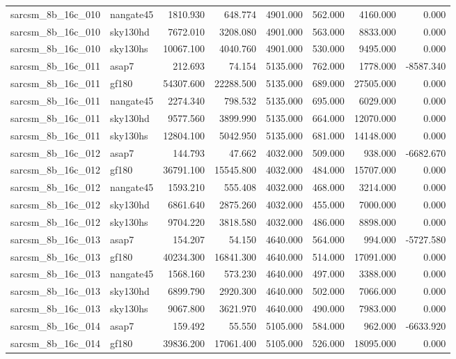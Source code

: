 \begin{tabular}{llrrrrrr}
sarcsm\_8b\_16c\_010 & nangate45 & 1810.930 & 648.774 & 4901.000 & 562.000 & 4160.000 & 0.000 \\
sarcsm\_8b\_16c\_010 & sky130hd & 7672.010 & 3208.080 & 4901.000 & 563.000 & 8833.000 & 0.000 \\
sarcsm\_8b\_16c\_010 & sky130hs & 10067.100 & 4040.760 & 4901.000 & 530.000 & 9495.000 & 0.000 \\
sarcsm\_8b\_16c\_011 & asap7 & 212.693 & 74.154 & 5135.000 & 762.000 & 1778.000 & -8587.340 \\
sarcsm\_8b\_16c\_011 & gf180 & 54307.600 & 22288.500 & 5135.000 & 689.000 & 27505.000 & 0.000 \\
sarcsm\_8b\_16c\_011 & nangate45 & 2274.340 & 798.532 & 5135.000 & 695.000 & 6029.000 & 0.000 \\
sarcsm\_8b\_16c\_011 & sky130hd & 9577.560 & 3899.990 & 5135.000 & 664.000 & 12070.000 & 0.000 \\
sarcsm\_8b\_16c\_011 & sky130hs & 12804.100 & 5042.950 & 5135.000 & 681.000 & 14148.000 & 0.000 \\
sarcsm\_8b\_16c\_012 & asap7 & 144.793 & 47.662 & 4032.000 & 509.000 & 938.000 & -6682.670 \\
sarcsm\_8b\_16c\_012 & gf180 & 36791.100 & 15545.800 & 4032.000 & 484.000 & 15707.000 & 0.000 \\
sarcsm\_8b\_16c\_012 & nangate45 & 1593.210 & 555.408 & 4032.000 & 468.000 & 3214.000 & 0.000 \\
sarcsm\_8b\_16c\_012 & sky130hd & 6861.640 & 2875.260 & 4032.000 & 455.000 & 7000.000 & 0.000 \\
sarcsm\_8b\_16c\_012 & sky130hs & 9704.220 & 3818.580 & 4032.000 & 486.000 & 8898.000 & 0.000 \\
sarcsm\_8b\_16c\_013 & asap7 & 154.207 & 54.150 & 4640.000 & 564.000 & 994.000 & -5727.580 \\
sarcsm\_8b\_16c\_013 & gf180 & 40234.300 & 16841.300 & 4640.000 & 514.000 & 17091.000 & 0.000 \\
sarcsm\_8b\_16c\_013 & nangate45 & 1568.160 & 573.230 & 4640.000 & 497.000 & 3388.000 & 0.000 \\
sarcsm\_8b\_16c\_013 & sky130hd & 6899.790 & 2920.300 & 4640.000 & 502.000 & 7066.000 & 0.000 \\
sarcsm\_8b\_16c\_013 & sky130hs & 9067.800 & 3621.970 & 4640.000 & 490.000 & 7983.000 & 0.000 \\
sarcsm\_8b\_16c\_014 & asap7 & 159.492 & 55.550 & 5105.000 & 584.000 & 962.000 & -6633.920 \\
sarcsm\_8b\_16c\_014 & gf180 & 39836.200 & 17061.400 & 5105.000 & 526.000 & 18095.000 & 0.000 \\

\end{tabular}
